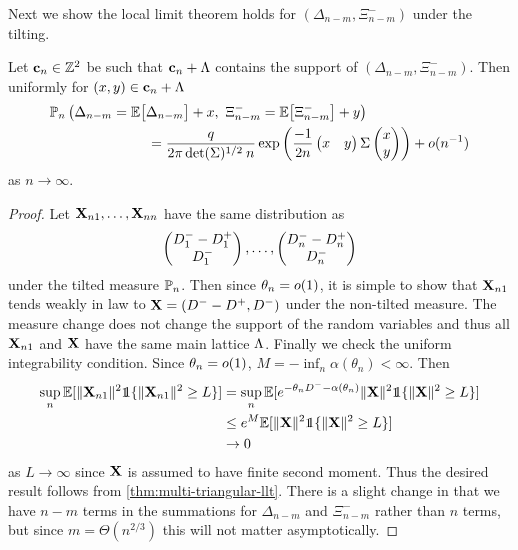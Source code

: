 Next we show the local limit theorem holds for $(\Delta_{n-m}, \Xi^-_{n-m})$ under the tilting.
\begin{lemma}
    \label{lem:bivar-llt}
    Let $\vc_n \in \Z^2$ be such that $\vc_n + \Lambda$ contains the support of $(\Delta_{n-m}, \Xi^-_{n-m})$. Then uniformly for $(x, y) \in \vc_n + \Lambda$
    \begin{align*}
        &\P_n\left(
            \Delta_{n-m} = \E \big[ \Delta_{n-m} \big] + x, \ 
            \Xi^-_{n-m} = \E \big[ \Xi^-_{n-m} \big] + y
        \right)  \nonumber \\
        &\hspace{7em} = \frac{q}{2\pi \det(\Sigma)^{1/2} \: n} \exp\left( 
            \frac{-1}{2n}
            \begin{pmatrix}
                x & y
            \end{pmatrix}
            \Sigma
            \begin{pmatrix}
                x \\ y
            \end{pmatrix}
         \right)
         + \littleo( n^{-1} )
    \end{align*}
    as $n \to \infty$.
\end{lemma}
\begin{proof}
    Let $\vX_{n1}, \ldots, \vX_{nn}$ have the same distribution as 
    \begin{equation*}
        \vectwo{D^-_1 - D^+_1}{D^-_1}, \ldots, \vectwo{D^-_n - D^+_n}{D^-_n}
    \end{equation*}
    under the tilted measure $\P_n$. Then since $\theta_n = \littleo(1)$, it is simple to show that $\vX_{n1}$ tends weakly in law to $\vX = (D^- - D^+, D^-)$ under the non-tilted measure. The measure change does not change the support of the random variables and thus all $\vX_{n1}$ and $\vX$ have the same main lattice $\lattice$. Finally we check the uniform integrability condition. Since $\theta_n = \littleo(1)$, $M = - \inf_n \alpha(\theta_n) < \infty$. Then
    \begin{align*}
        \sup_n \E[\norm{\vX_{n1}}^2 \one \{ \norm{\vX_{n1}}^2 \geq L \} ]
        &= \sup_n \E[e^{-\theta_n D^- - \alpha(\theta_n)} \norm{\vX}^2 \one\{\norm{\vX}^2 \geq L \} ] \\
        &\leq e^M \E[\norm{\vX}^2 \one\{\norm{\vX}^2 \geq L \} ] \\
        & \to 0
    \end{align*}
    as $L \to \infty$ since $\vX$ is assumed to have finite second moment. Thus the desired result follows from \cref{thm:multi-triangular-llt}. There is a slight change in that we have $n - m$ terms in the summations for $\Delta_{n-m}$ and $\Xi^-_{n-m}$ rather than $n$ terms, but since $m = \Theta(n^{2/3})$ this will not matter asymptotically.
\end{proof}

